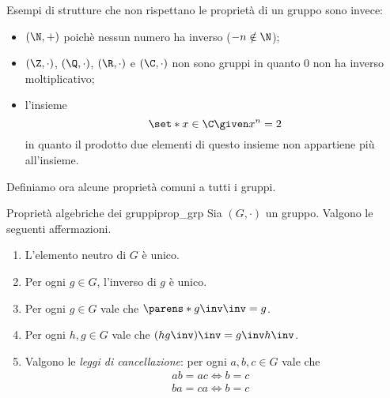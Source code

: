 Esempi di strutture che non rispettano le proprietà di un gruppo sono invece:
\begin{itemize}
    \item $(\N, +)$ poichè nessun numero ha inverso ($-n \notin \N$);
    \item $(\Z, \cdot)$, $(\Q, \cdot)$, $(\R, \cdot)$ e $(\C, \cdot)$ non sono gruppi in quanto $0$ non ha inverso moltiplicativo;
    \item l'insieme \[
        \set*{x \in \C \given x^n = 2}    
    \] in quanto il prodotto due elementi di questo insieme non appartiene più all'insieme.
\end{itemize}

Definiamo ora alcune proprietà comuni a tutti i gruppi.

\begin{proposition}
    {Proprietà algebriche dei gruppi}{prop_grp}
    Sia $(G, \cdot)$ un gruppo. Valgono le seguenti affermazioni.
    \begin{enumerate}[label={(\roman*)}]
        \item \label{prop:prop_grp:e_unico} L'elemento neutro di $G$ è unico.
        \item \label{prop:prop_grp:inv_unico} Per ogni $g \in G$, l'inverso di $g$ è unico.
        \item \label{prop:prop_grp:inv_inv} Per ogni $g \in G$ vale che $\parens*{g\inv}\inv = g$.
        \item \label{prop:prop_grp:inv_prod} Per ogni $h, g \in G$ vale che $(hg\inv)\inv = g\inv h\inv$. 
        \item \label{prop:prop_grp:canc} Valgono le \emph{leggi di cancellazione}: per ogni $a, b, c \in G$ vale che \begin{align}
            ab = ac \iff b = c &\tag{sx} \label{prop:prop_grp:canc:sx}\\
            ba = ca \iff b = c &\tag{dx} \label{prop:prop_grp:canc:dx}
        \end{align}
    \end{enumerate}
\end{proposition}
